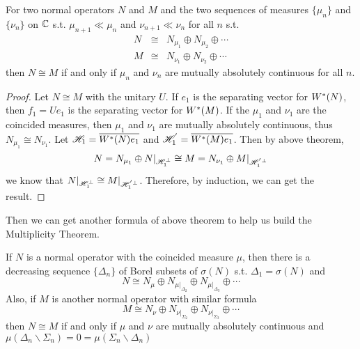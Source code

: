 \documentclass[a4paper,11pt]{report}
\begin{document}
\begin{thm}
	For two normal operators $N$ and $M$ and the two sequences of measures $\{\mu_n\}$ and $\{\nu_n\}$ on $\mathbb{C}$ s.t. $\mu_{n+1} \ll \mu_{n}$ and $\nu_{n+1} \ll \nu_{n}$ for all $n$ s.t.
	\begin{eqnarray*}
		N &\cong& N_{\mu_1} \oplus N_{\mu_2} \oplus \cdots \\
		M &\cong& N_{\nu_1} \oplus N_{\nu_2} \oplus \cdots
	\end{eqnarray*}
	then $N \cong M$ if and only if $\mu_n$ and $\nu_n$ are mutually absolutely continuous for all $n$.
\end{thm}
\begin{proof}
	Let $N \cong M$ with the unitary $U$. If $e_1$ is the separating vector for $W^{*}(N)$, then $f_1 = Ue_1$ is the separating vector for $W^{*}(M)$. If the $\mu_1$ and $\nu_1$ are the coincided measures, then $\mu_1$ and $\nu_1$ are mutually absolutely continuous, thus $N_{\mu_1} \cong N_{\nu_1}$. Let $\mathscr{H}_1 = \overline{W^{*}(N)e_1}$ and $\mathscr{H}_1^{'} = \overline{W^{*}(M)e_1}$. Then by above theorem,
	\begin{equation*}
		N = N_{\mu_1} \oplus N|_{\mathscr{H}_1^{\bot}} \cong M = N_{\nu_1} \oplus M|_{\mathscr{H}_1^{'\bot}}
	\end{equation*}
	we know that $N|_{\mathscr{H}_1^{\bot}} \cong M|_{\mathscr{H}_1^{'\bot}}$. Therefore, by induction, we can get the result.
\end{proof}

Then we can get another formula of above theorem to help us build the Multiplicity Theorem.
\begin{cor}
 	If $N$ is a normal operator with the coincided measure $\mu$, then there is a decreasing sequence $\{\Delta_n\}$ of Borel subsets of $\sigma(N)$ s.t. $\Delta_1 = \sigma(N)$ and 
 	\begin{equation*}
 		N \cong N_{\mu} \oplus N_{\mu|_{\Delta_2}} \oplus N_{\mu|_{\Delta_3}} \oplus \cdots
 	\end{equation*}
 	Also, if $M$ is another normal operator with similar formula
 	\begin{equation*}
 		M \cong N_{\nu} \oplus N_{\nu|_{\Sigma_2}} \oplus N_{\nu|_{\Sigma_3}} \oplus \cdots
 	\end{equation*}
 	then $N \cong M$ if and only if $\mu$ and $\nu$ are mutually absolutely continuous and $\mu(\Delta_n \backslash \Sigma_n) = 0 = \mu(\Sigma_n \backslash \Delta_n)$
\end{cor}
\end{document}
